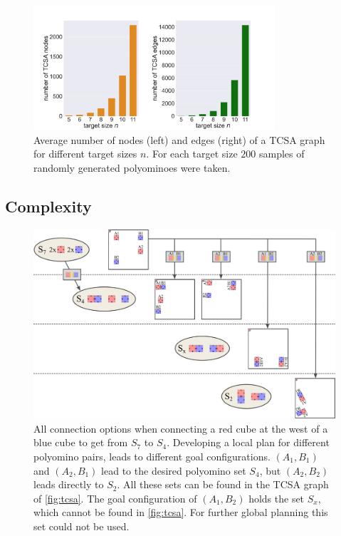 \begin{figure}
	\centering
	\includegraphics[width=0.8\textwidth]{figures/plots/tcsa_nodes_edges.pdf}
	\caption[Average two-cut-sub-assembly nodes and edges for target size $n$.]{Average number of nodes (left) and edges (right) of a TCSA graph for different target sizes $n$.
	For each target size $200$ samples of randomly generated polyominoes were taken.}
	\label{fig:tcsa_plot}
\end{figure}

\subsection{Complexity}



\begin{figure}
	\centering
	\includegraphics[width=1\textwidth]{figures/connect_options.pdf}
	\caption[Example of connection options for one two-cut-sub-assembly edge]{All connection options when connecting a red cube at the west of a blue cube to get from $S_7$ to $S_4$. Developing a local plan for different polyomino pairs, leads to different goal configurations. $(A_1,B_1)$ and $(A_2,B_1)$ lead to the desired polyomino set $S_4$, but $(A_2,B_2)$ leads directly to $S_2$. All these sets can be found in the TCSA graph of \autoref{fig:tcsa}. The goal configuration of $(A_1, B_2)$ holds the set $S_x$, which cannot be found in \autoref{fig:tcsa}. For further global planning this set could not be used.}
	\label{fig:connect_options}
\end{figure}



